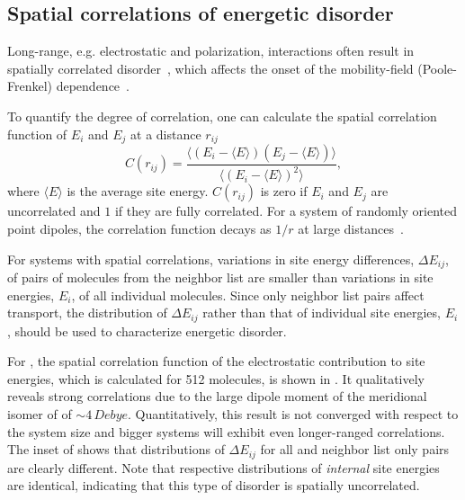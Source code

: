 \subsection{Spatial correlations of energetic disorder}
Long-range, e.g. electrostatic and polarization, interactions often result in spatially correlated disorder~\cite{dunlap_charge-dipole_1996}, which affects the onset of the mobility-field (Poole-Frenkel) dependence~\cite{derrida_velocity_1983,novikov_essential_1998,nagata_atomistic_2008}.    

To quantify the degree of correlation, one can calculate the spatial correlation function of $E_i$ and $E_j$ at a distance $r_{ij}$
\begin{equation}
\label{equ:cf}
C(r_{ij}) = \frac{  \langle \left( E_i-\langle E\rangle \right)
                   \left( E_j-\langle E\rangle \right)\rangle}
                   {\langle\left( E_i -\langle E\rangle \right)^2\rangle},
\end{equation}
where $\langle E\rangle$ is the average site energy. $C(r_{ij})$ is zero if $E_i$ and $E_j$ are uncorrelated and $1$ if they are fully correlated. For a system of randomly oriented point dipoles, the correlation function decays as $1/r$ at large distances~\cite{novikov_cluster_1995}.

For systems with spatial correlations, variations in site energy differences, $\Delta E_{ij}$, of pairs of molecules from the neighbor list are smaller than variations in site energies, $E_i$, of all individual molecules. Since only neighbor list pairs affect transport, the distribution of $\Delta E_{ij}$ rather than that of individual site energies, $E_i$, should be used to characterize energetic disorder.

For \Alq, the spatial correlation function of the electrostatic contribution to site energies, which is calculated for 512 molecules, is shown in . It qualitatively reveals strong correlations due to the large dipole moment of the meridional isomer of \Alq of $\sim 4\, \unit{Debye}$. Quantitatively, this result is not converged with respect to the system size and bigger systems will exhibit even longer-ranged correlations.
%
The inset of  shows that distributions of $\Delta E_{ij}$ for all and neighbor list only pairs are clearly different. Note that respective distributions of {\it internal} site energies are identical, indicating that this type of disorder is spatially uncorrelated.
